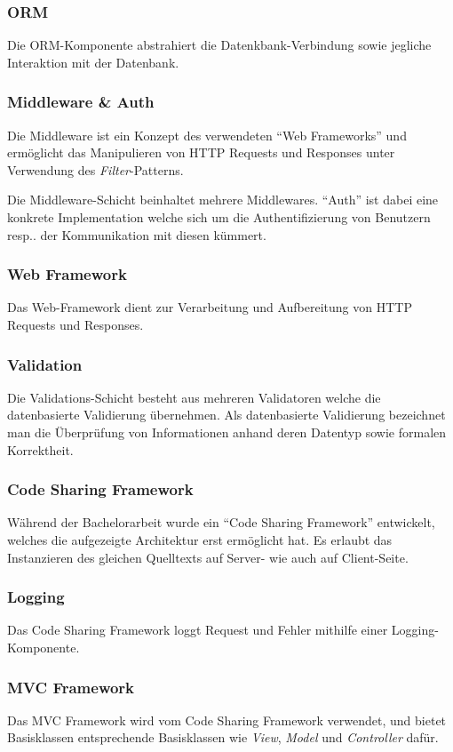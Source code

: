 \subsubsection*{ORM}
Die ORM-Komponente abstrahiert die Datenkbank-Verbindung sowie jegliche Interaktion mit der Datenbank.

\subsubsection*{\gls{Middleware} \& Auth}
Die \gls{Middleware} ist ein Konzept des verwendeten ``Web Frameworks'' und ermöglicht das Manipulieren von HTTP Requests und Responses unter Verwendung des \emph{Filter}-Patterns.

Die Middleware-Schicht beinhaltet mehrere Middlewares. ``Auth'' ist dabei eine konkrete Implementation welche sich um die Authentifizierung von Benutzern resp.. der Kommunikation mit diesen kümmert.

\subsubsection*{Web Framework}
Das Web-Framework dient zur Verarbeitung und Aufbereitung von HTTP Requests und Responses.

\subsubsection*{Validation}
Die Validations-Schicht besteht aus mehreren Validatoren welche die datenbasierte Validierung übernehmen. Als datenbasierte Validierung bezeichnet man die Überprüfung von Informationen anhand deren Datentyp sowie formalen Korrektheit.

\subsubsection*{Code Sharing Framework}
Während der Bachelorarbeit wurde ein ``Code Sharing Framework'' entwickelt, welches die aufgezeigte Architektur erst ermöglicht hat. Es erlaubt das Instanzieren des gleichen Quelltexts auf Server- wie auch auf Client-Seite.

\subsubsection*{Logging}
Das Code Sharing Framework loggt Request und Fehler mithilfe einer Logging-Komponente.

\subsubsection*{MVC Framework}
Das MVC Framework wird vom Code Sharing Framework verwendet, und bietet Basisklassen entsprechende Basisklassen wie \emph{View}, \emph{Model} und \emph{Controller} dafür.

